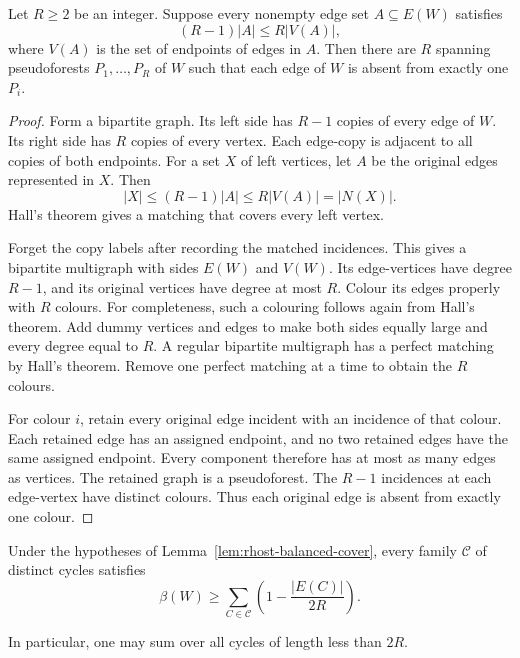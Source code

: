 \begin{lemma}
\label{lem:rhost-balanced-cover}
Let $R\ge2$ be an integer.
Suppose every nonempty edge set $A\subseteq E(W)$ satisfies
\[
 (R-1)|A|\le R|V(A)|,
\]
where $V(A)$ is the set of endpoints of edges in $A$.
Then there are $R$ spanning pseudoforests $P_1,\ldots,P_R$ of $W$
such that each edge of $W$ is absent from exactly one $P_i$.
\end{lemma}

\begin{proof}
Form a bipartite graph.
Its left side has $R-1$ copies of every edge of $W$.
Its right side has $R$ copies of every vertex.
Each edge-copy is adjacent to all copies of both endpoints.
For a set $X$ of left vertices, let $A$ be the original edges represented in $X$.
Then
\[
 |X|\le(R-1)|A|\le R|V(A)|=|N(X)|.
\]
Hall's theorem gives a matching that covers every left vertex.

Forget the copy labels after recording the matched incidences.
This gives a bipartite multigraph with sides $E(W)$ and $V(W)$.
Its edge-vertices have degree $R-1$, and its original vertices have degree at most $R$.
Colour its edges properly with $R$ colours.
For completeness, such a colouring follows again from Hall's theorem.
Add dummy vertices and edges to make both sides equally large and every degree equal to $R$.
A regular bipartite multigraph has a perfect matching by Hall's theorem.
Remove one perfect matching at a time to obtain the $R$ colours.

For colour $i$, retain every original edge incident with an incidence of that colour.
Each retained edge has an assigned endpoint, and no two retained edges have the same assigned endpoint.
Every component therefore has at most as many edges as vertices.
The retained graph is a pseudoforest.
The $R-1$ incidences at each edge-vertex have distinct colours.
Thus each original edge is absent from exactly one colour.
\end{proof}

\begin{proposition}
\label{prop:rhost-weighted-cycles}
Under the hypotheses of Lemma~\ref{lem:rhost-balanced-cover}, every family
$\mathcal C$ of distinct cycles satisfies
\[
 \boxed{\quad
 \beta(W)\ge\sum_{C\in\mathcal C}
 \left(1-\frac{|E(C)|}{2R}\right).
 \quad}
\]

In particular, one may sum over all cycles of length less than $2R$.
\end{proposition}

